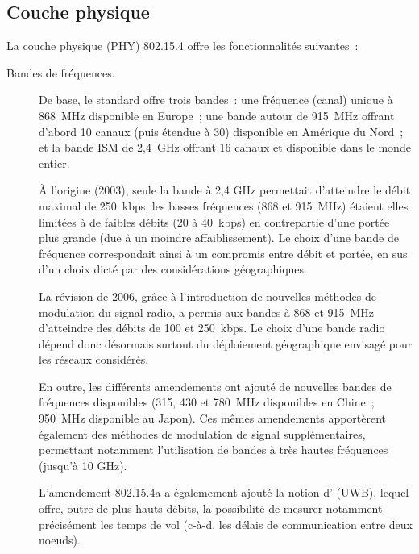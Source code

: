 \subsection{Couche physique}
\label{Subsec802154PHY}

La couche physique (PHY) 802.15.4 offre les fonctionnalités suivantes~:

\begin{description}

\item[Bandes de fréquences.]
De base, le standard offre trois bandes~:
une fréquence (canal) unique à 868~MHz disponible en Europe~;
une bande autour de 915~MHz offrant d'abord 10 canaux (puis étendue à 30)
disponible en Amérique du Nord~;
et la bande ISM de 2,4~GHz offrant 16 canaux et disponible dans le monde
entier.

À l'origine (2003), seule la bande à 2,4 GHz permettait d'atteindre le
débit maximal de 250~kbps, les basses fréquences (868 et 915~MHz) étaient
elles limitées à de faibles débits (20 à 40~kbps) en contrepartie d'une
portée plus grande (due à un moindre affaiblissement).
Le choix d'une bande de fréquence correspondait ainsi à un compromis entre
débit et portée, en sus d'un choix dicté par des considérations géographiques.

La révision de 2006, grâce à l'introduction de nouvelles méthodes de
modulation du signal radio, a permis aux bandes à 868 et 915~MHz d'atteindre
des débits de 100 et 250~kbps. Le choix d'une bande radio dépend donc
désormais surtout du déploiement géographique envisagé pour les réseaux
considérés.

En outre, les différents amendements ont ajouté de nouvelles bandes
de fréquences disponibles (315, 430 et 780~MHz disponibles en Chine~;
950~MHz disponible au Japon).
Ces mêmes amendements apportèrent également des méthodes de modulation
de signal supplémentaires, permettant notamment l'utilisation de bandes
à très hautes fréquences (jusqu'à 10 GHz).

L'amendement 802.15.4a a égalemement ajouté la notion d' (UWB), lequel offre, outre de plus hauts débits, la possibilité de
mesurer notamment précisément les temps de vol (c-à-d. les délais de
communication entre deux noeuds).


\end{description}
